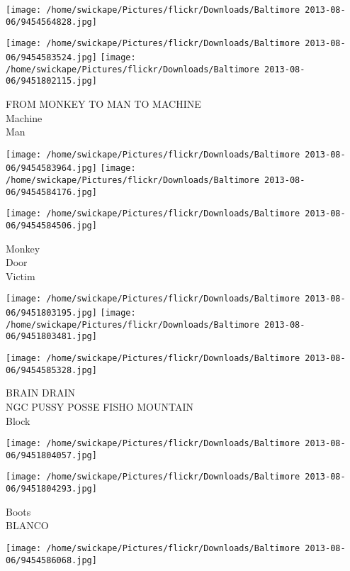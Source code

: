 \documentclass[10pt,letterpaper]{article}
\begin{document}
\texttt{[image: /home/swickape/Pictures/flickr/Downloads/Baltimore 2013-08-06/9454564828.jpg]}

\vspace{0.25in}
\texttt{[image: /home/swickape/Pictures/flickr/Downloads/Baltimore 2013-08-06/9454583524.jpg]}
\texttt{[image: /home/swickape/Pictures/flickr/Downloads/Baltimore 2013-08-06/9451802115.jpg]}

FROM MONKEY TO MAN TO MACHINE\\
Machine\\
Man\\
\pagebreak

\texttt{[image: /home/swickape/Pictures/flickr/Downloads/Baltimore 2013-08-06/9454583964.jpg]}
\texttt{[image: /home/swickape/Pictures/flickr/Downloads/Baltimore 2013-08-06/9454584176.jpg]}

\vspace{0.25in}
\texttt{[image: /home/swickape/Pictures/flickr/Downloads/Baltimore 2013-08-06/9454584506.jpg]}

Monkey\\
Door\\
Victim\\
\pagebreak

\texttt{[image: /home/swickape/Pictures/flickr/Downloads/Baltimore 2013-08-06/9451803195.jpg]}
\texttt{[image: /home/swickape/Pictures/flickr/Downloads/Baltimore 2013-08-06/9451803481.jpg]}

\vspace{0.25in}
\texttt{[image: /home/swickape/Pictures/flickr/Downloads/Baltimore 2013-08-06/9454585328.jpg]}

BRAIN DRAIN\\
NGC PUSSY POSSE FISHO MOUNTAIN\\
Block\\
\pagebreak

\texttt{[image: /home/swickape/Pictures/flickr/Downloads/Baltimore 2013-08-06/9451804057.jpg]}

\vspace{0.25in}
\texttt{[image: /home/swickape/Pictures/flickr/Downloads/Baltimore 2013-08-06/9451804293.jpg]}

Boots\\
BLANCO\\
\pagebreak

\texttt{[image: /home/swickape/Pictures/flickr/Downloads/Baltimore 2013-08-06/9454586068.jpg]}
\end{document}
